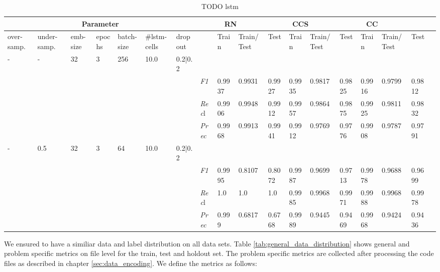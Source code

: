 \begin{table}[]
    \tiny
    \tabcolsep=0.11cm
    \begin{tabularx}{\textwidth}{XXXXXXX|X|XXX|XXX|XXXX}
    \toprule
    \multicolumn{7}{c}{Parameter} & \multicolumn{3}{c}{RN} & \multicolumn{3}{c}{CCS} & \multicolumn{3}{c}{CC} \\ \midrule
    over-\newline samp. & under-\newline samp. & emb-\newline size & epochs &batch-\newline size & \#lstm-\newline cells & dropout & & Train & Train/\newline Test & Test & Train & Train/\newline Test & Test & Train & Train/\newline Test & Test \\ \midrule
    - & - & 32 & 3 & 256 &10.0 & 0.2|0.2 & & & & & & & & & \\
    & & & & & & & \textit{F1} & 0.9937 & 0.9931 & 0.9927 & 0.9935 & 0.9817        & 0.9825        & 0.9916        & 0.9799        & 0.9812        \\
    & & & & & & & \textit{Rec}l & 0.9906 & 0.9948 & 0.9912    & 0.9957 & 0.9864    & 0.9875    & 0.9925    & 0.9811    & 0.9832    \\
    & & & & & & & \textit{Prec} & 0.9968 & 0.9913 & 0.9941 & 0.9912 & 0.9769 & 0.9776 & 0.9908 & 0.9787 & 0.9791 \\ \midrule
    - & 0.5 & 32 & 3 & 64 &10.0 & 0.2|0.2 & & & & & & & & & \\
    & & & & & & & \textit{F1} & 0.9995 & 0.8107 & 0.8072 & 0.9987 & 0.9699        & 0.9713        & 0.9978        & 0.9688        & 0.9699        \\
    & & & & & & & \textit{Rec}l & 1.0 & 1.0 & 1.0    & 0.9985 & 0.9968    & 0.9971    & 0.9988    & 0.9968    & 0.9978    \\
    & & & & & & & \textit{Prec} & 0.999 & 0.6817 & 0.6768 & 0.9989 & 0.9445 & 0.9469 & 0.9968 & 0.9424 & 0.9436 \\ \midrule
\end{tabularx}
\caption{TODO lstm}
\label{tab:lstm_wrong_train_test_split}
\end{table}

We ensured to have a similiar data and label distribution on all data sets. Table \ref{tab:general_data_distribution} shows general and problem specific metrics on file level for the train, test and holdout set. The problem specific metrics are collected after processing the code files as described in chapter \ref{sec:data_encoding}. We define the metrics as follows:

